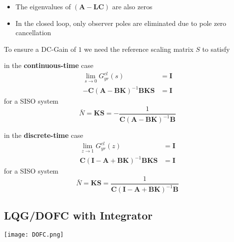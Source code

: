 \begin{itemize}
    \item The eigenvalues of $(\mathbf{A}-\mathbf{LC})$ are also zeros
    \item In the closed loop, only observer poles are eliminated due to pole zero cancellation
\end{itemize}




To ensure a DC-Gain of $1$ we need the reference scaling matrix $S$ to satisfy

in the \textbf{continuous-time} case
\begin{align*}
    \lim_{s\to0}G_{yr}^{cl}(s)                             & = \mathbf{I} \\
    -\mathbf{C}{(\mathbf{A}-\mathbf{BK})}^{-1}\mathbf{BKS} & = \mathbf{I}
\end{align*}
for a SISO system
\begin{equation*}
    \bar{N}=\mathbf{KS}=-\frac{1}{\mathbf{C}{(\mathbf{A}-\mathbf{BK})}^{-1}\mathbf{B}}
\end{equation*}

in the \textbf{discrete-time} case
\begin{align*}
    \lim_{z\to1}G_{yr}^{cl}(z)                                       & = \mathbf{I} \\
    \mathbf{C}{(\mathbf{I}-\mathbf{A}+\mathbf{BK})}^{-1}\mathbf{BKS} & = \mathbf{I}
\end{align*}
for a SISO system
\begin{equation*}
    \bar{N}=\mathbf{KS}=\frac{1}{\mathbf{C}{(\mathbf{I}-\mathbf{A}+\mathbf{BK})}^{-1}\mathbf{B}}
\end{equation*}

\subsection{LQG/DOFC with Integrator}

\begin{center}
    \texttt{[image: DOFC.png]}
\end{center}


